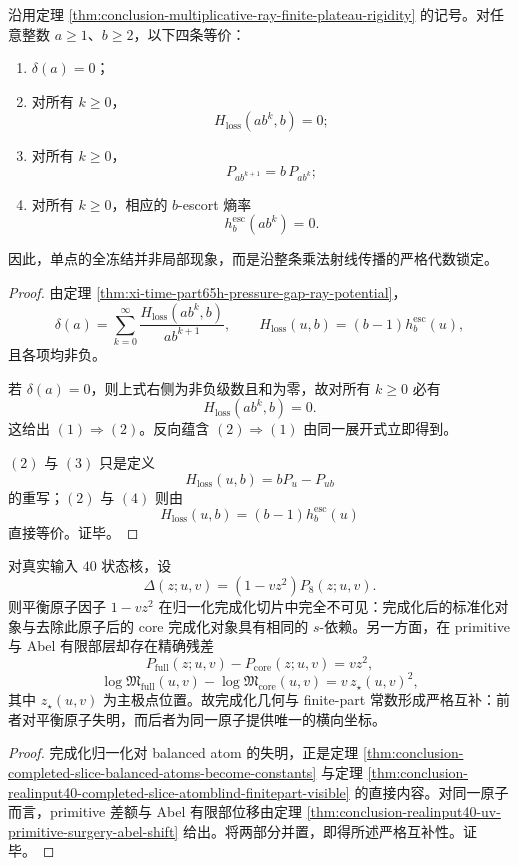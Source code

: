 \begin{theorem}[乘法射线全冻结的四重等价]\label{thm:conclusion-multiplicative-ray-total-freezing-equivalences}
沿用定理 \ref{thm:conclusion-multiplicative-ray-finite-plateau-rigidity} 的记号。对任意整数 \(a\ge 1\)、\(b\ge 2\)，以下四条等价：
\begin{enumerate}
  \item \(\delta(a)=0\)；
  \item 对所有 \(k\ge 0\)，
  \[
  H_{\mathrm{loss}}(ab^k,b)=0;
  \]
  \item 对所有 \(k\ge 0\)，
  \[
  P_{ab^{k+1}}=b\,P_{ab^k};
  \]
  \item 对所有 \(k\ge 0\)，相应的 \(b\)-escort 熵率
  \[
  h_b^{\mathrm{esc}}(ab^k)=0.
  \]
\end{enumerate}
因此，单点的全冻结并非局部现象，而是沿整条乘法射线传播的严格代数锁定。
\end{theorem}
\begin{proof}
由定理 \ref{thm:xi-time-part65h-pressure-gap-ray-potential}，
\[
\delta(a)=\sum_{k=0}^{\infty}\frac{H_{\mathrm{loss}}(ab^k,b)}{ab^{k+1}},
\qquad
H_{\mathrm{loss}}(u,b)=(b-1)h_b^{\mathrm{esc}}(u),
\]
且各项均非负。

若 \(\delta(a)=0\)，则上式右侧为非负级数且和为零，故对所有 \(k\ge 0\) 必有
\[
H_{\mathrm{loss}}(ab^k,b)=0.
\]
这给出 \((1)\Rightarrow(2)\)。反向蕴含 \((2)\Rightarrow(1)\) 由同一展开式立即得到。

\((2)\) 与 \((3)\) 只是定义
\[
H_{\mathrm{loss}}(u,b)=bP_u-P_{ub}
\]
的重写；\((2)\) 与 \((4)\) 则由
\[
H_{\mathrm{loss}}(u,b)=(b-1)h_b^{\mathrm{esc}}(u)
\]
直接等价。证毕。
\end{proof}

\begin{theorem}\label{thm:conclusion-realinput40-balanced-atom-completion-finitepart-complementarity}
对真实输入 \(40\) 状态核，设
\[
\Delta(z;u,v)=(1-vz^2)P_8(z;u,v).
\]
则平衡原子因子 \(1-vz^2\) 在归一化完成化切片中完全不可见：完成化后的标准化对象与去除此原子后的 core 完成化对象具有相同的 \(s\)-依赖。另一方面，在 primitive 与 Abel 有限部层却存在精确残差
\[
P_{\mathrm{full}}(z;u,v)-P_{\mathrm{core}}(z;u,v)=vz^2,
\]
\[
\log\mathfrak M_{\mathrm{full}}(u,v)-\log\mathfrak M_{\mathrm{core}}(u,v)
=
v\,z_\star(u,v)^2,
\]
其中 \(z_\star(u,v)\) 为主极点位置。故完成化几何与 finite-part 常数形成严格互补：前者对平衡原子失明，而后者为同一原子提供唯一的横向坐标。
\end{theorem}
\begin{proof}
完成化归一化对 balanced atom 的失明，正是定理 \ref{thm:conclusion-completed-slice-balanced-atoms-become-constants} 与定理 \ref{thm:conclusion-realinput40-completed-slice-atomblind-finitepart-visible} 的直接内容。对同一原子而言，primitive 差额与 Abel 有限部位移由定理 \ref{thm:conclusion-realinput40-uv-primitive-surgery-abel-shift} 给出。将两部分并置，即得所述严格互补性。证毕。
\end{proof}

